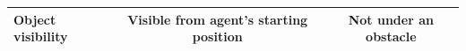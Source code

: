 \begin{table}[th]
\begin{scriptsize}
\begin{tabular}{lccc}
Object visibility & \multicolumn{2}{c}{Visible from agent's starting position} & Not under an obstacle \\ 

\bottomrule
\end{tabular}
\end{scriptsize}

\label{knobs}

\end{table}